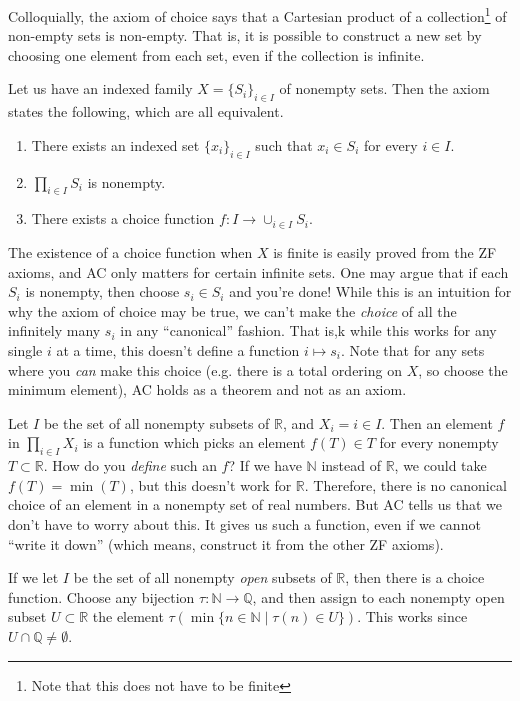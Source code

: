   Colloquially, the axiom of choice says that a Cartesian product of a collection\footnote{Note that this does not have to be finite} of non-empty sets is non-empty. That is, it is possible to construct a new set by choosing one element from each set, even if the collection is infinite. 

  \begin{axiom}
    Let us have an indexed family $X = \{S_i\}_{i \in I}$ of nonempty sets. Then the axiom states the following, which are all equivalent. 
    \begin{enumerate}
      \item There exists an indexed set $\{x_i\}_{i \in I}$ such that $x_i \in S_i$ for every $i \in I$. 
      \item $\prod_{i \in I} S_i$ is nonempty. 
      \item There exists a choice function $f: I \rightarrow \cup_{i \in I} S_i$. 
    \end{enumerate}
  \end{axiom}

  The existence of a choice function when $X$ is finite is easily proved from the ZF axioms, and AC only matters for certain infinite sets. One may argue that if each $S_i$ is nonempty, then choose $s_i \in S_i$ and you're done! While this is an intuition for why the axiom of choice may be true, we can't make the \textit{choice} of all the infinitely many $s_i$ in any ``canonical'' fashion. That is,k while this works for any single $i$ at a time, this doesn't define a function $i \mapsto s_i$. Note that for any sets where you \textit{can} make this choice (e.g. there is a total ordering on $X$, so choose the minimum element), AC holds as a theorem and not as an axiom. 

  \begin{example}
    Let $I$ be the set of all nonempty subsets of $\mathbb{R}$, and $X_i = i \in I$. Then an element $f$ in $\prod_{i \in I} X_i$ is a function which picks an element $f(T) \in T$ for every nonempty $T \subset \mathbb{R}$. How do you \textit{define} such an $f$? If we have $\mathbb{N}$ instead of $\mathbb{R}$, we could take $f(T) = \min(T)$, but this doesn't work for $\mathbb{R}$. Therefore, there is no canonical choice of an element in a nonempty set of real numbers. But AC tells us that we don't have to worry about this. It gives us such a function, even if we cannot ``write it down'' (which means, construct it from the other ZF axioms).  

    If we let $I$ be the set of all nonempty \textit{open} subsets of $\mathbb{R}$, then there is a choice function. Choose any bijection $\tau: \mathbb{N} \rightarrow \mathbb{Q}$, and then assign to each nonempty open subset $U \subset \mathbb{R}$ the element $\tau (\min\{n \in \mathbb{N} \mid \tau(n) \in U\})$. This works since $U \cap \mathbb{Q} \neq \emptyset$. 
  \end{example}


